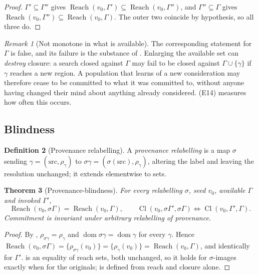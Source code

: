 \documentclass[11pt,a4paper]{article}
\theoremstyle{clstyle}
\newtheorem{theorem}{Theorem}[section]
\theoremstyle{definition}
\newtheorem{definition}[theorem]{Definition}
\theoremstyle{remark}
\newtheorem{remark}[theorem]{Remark}
\DeclareMathOperator{\Reach}{Reach}
\DeclareMathOperator{\Cl}{Cl}
\DeclareMathOperator{\dom}{dom}
\begin{document}
\begin{proof}
$\Gamma'\subseteq\Gamma''$ gives
$\Reach(v_0,\Gamma')\subseteq\Reach(v_0,\Gamma'')$, and
$\Gamma''\subseteq\Gamma$ gives
$\Reach(v_0,\Gamma'')\subseteq\Reach(v_0,\Gamma)$. The outer two coincide by
hypothesis, so all three do.
\end{proof}

\begin{remark}[Not monotone in what is available]
\label{rem:not-mono-avail}
The corresponding statement for $\Gamma$ is false, and its failure is the
substance of . Enlarging the available set can
\emph{destroy} closure: a search closed against $\Gamma$ may fail to be
closed against $\Gamma\cup\{\gamma\}$ if $\gamma$ reaches a new region. A
population that learns of a new consideration may therefore cease to be
committed to what it was committed to, without anyone having changed their
mind about anything already considered.  (E14) measures
how often this occurs.
\end{remark}

\subsection{Blindness}
\label{sec:blind}

\begin{definition}[Provenance relabelling]
\label{def:relabel}
A \emph{provenance relabelling} is a map $\sigma$ sending
$\gamma=(\mathrm{src},\rho_\gamma)$ to
$\sigma\gamma=(\sigma(\mathrm{src}),\rho_\gamma)$, altering the label and
leaving the resolution unchanged; it extends elementwise to sets.
\end{definition}

\begin{theorem}[Provenance-blindness]
\label{thm:blind}
For every relabelling $\sigma$, seed $v_0$, available $\Gamma$ and invoked
$\Gamma'$,
\[
\Reach(v_0,\sigma\Gamma)=\Reach(v_0,\Gamma),\qquad
\Cl(v_0,\sigma\Gamma',\sigma\Gamma)\iff\Cl(v_0,\Gamma',\Gamma).
\]
Commitment is invariant under arbitrary relabelling of provenance.
\end{theorem}

\begin{proof}
By , $\rho_{\sigma\gamma}=\rho_\gamma$ and
$\dom\sigma\gamma=\dom\gamma$ for every $\gamma$. Hence
$\Reach(v_0,\sigma\Gamma)
=\{\rho_{\sigma\gamma}(v_0)\}=\{\rho_{\gamma}(v_0)\}=\Reach(v_0,\Gamma)$,
and identically for $\Gamma'$.  is an equality of reach
sets, both unchanged, so it holds for $\sigma$-images exactly when for the
originals;  is defined from reach and closure alone.
\end{proof}
\end{document}
